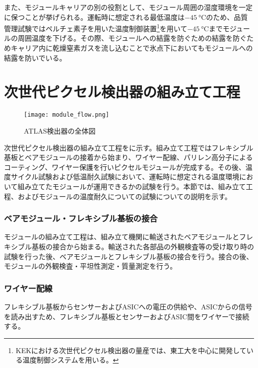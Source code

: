 また、モジュールキャリアの別の役割として、モジュール周囲の湿度環境を一定に保つことが挙げられる。運転時に想定される最低温度は$-45\ \si{\degreeCelsius}$のため、品質管理試験ではペルチェ素子を用いた温度制御装置\footnote{KEKにおける次世代ピクセル検出器の量産では、東工大を中心に開発している温度制御システムを用いる。}を用いて$-45\ \si{\degreeCelsius}$までモジュールの周囲温度を下げる。その際、モジュールへの結露を防ぐための結露を防ぐためキャリア内に乾燥窒素ガスを流し込むことで氷点下においてもモジュールへの結露を防いでいる。

\section{次世代ピクセル検出器の組み立て工程}
\label{sec:assemble}
\begin{figure}[tbp]
  \centering
  \texttt{[image: module\_flow.png]}
  \caption[ATLAS検出器]{ATLAS検出器の全体図 \cite{studyofID} }
  \label{fig:assemble}
\end{figure}


次世代ピクセル検出器の組み立て工程をに示す。組み立て工程ではフレキシブル基板とベアモジュールの接着から始まり、ワイヤー配線、パリレン高分子によるコーティング、ワイヤー保護を行いピクセルモジュールが完成する。その後、温度サイクル試験および低温耐久試験において、運転時に想定される温度環境において組み立てたモジュールが運用できるかの試験を行う。本節では、組み立て工程、およびモジュールの温度耐久についての試験についての説明を示す。

\subsubsection*{ベアモジュール・フレキシブル基板の接合}

モジュールの組み立て工程は、組み立て機関に輸送されたベアモジュールとフレキシブル基板の接合から始まる。輸送された各部品の外観検査等の受け取り時の試験を行った後、ベアモジュールとフレキシブル基板の接合を行う。接合の後、モジュールの外観検査・平坦性測定・質量測定を行う。

\subsubsection*{ワイヤー配線}

フレキシブル基板からセンサーおよびASICへの電圧の供給や、ASICからの信号を読み出すため、フレキシブル基板とセンサーおよびASIC間をワイヤーで接続する。

